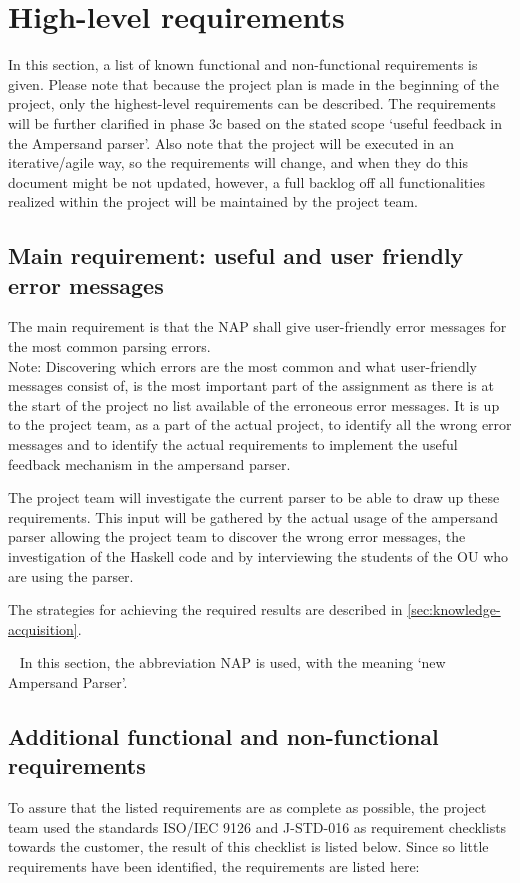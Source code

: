\section{High-level requirements}
\label{sec:requirements}
In this section, a list of known functional and non-functional requirements is given.
Please note that because the project plan is made in the beginning of the project, only the highest-level requirements can be described.
The requirements will be further clarified in phase 3c based on the stated scope `useful feedback in the Ampersand parser'.
Also note that the project will be executed in an iterative/agile way, so the requirements will change, and when they do this document might be not updated, however, a full backlog off all functionalities realized within the project will be maintained by the project team.

\subsection{Main requirement: useful and user friendly error messages}
The main requirement is that the NAP shall give user-friendly error messages for the most common parsing errors.\\
Note: Discovering which errors are the most common and what user-friendly messages consist of, is the most important part of the assignment as there is at the start of the project no list available of the erroneous error messages.
It is up to the project team, as a part of the actual project, to identify all the wrong error messages and to identify the actual requirements to implement the useful feedback mechanism in the ampersand parser.

The project team will investigate the current parser to be able to draw up these requirements.
This input will be gathered by the actual usage of the ampersand parser allowing the project team to discover the wrong error messages, the investigation of the Haskell code and by interviewing the students of the OU who are using the parser.

The strategies for achieving the required results are described in \autoref{sec:knowledge-acquisition}.

~\newline\noindent
In this section, the abbreviation NAP is used, with the meaning `new Ampersand Parser'.
%

\subsection{Additional functional and non-functional requirements}
To assure that the listed requirements are as complete as possible, the project team used the standards ISO/IEC 9126 \cite{iso-9126} and J-STD-016 \cite{jstd-016} as requirement checklists towards the customer, the result of this checklist is listed below.
Since so little requirements have been identified, the requirements are listed here:

